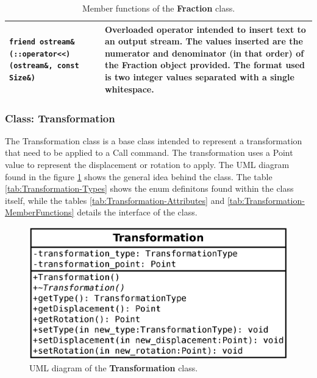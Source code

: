 \documentclass[11pt,twoside,openany,x11names,svgnames]{memoir}
\begin{document}
\begin{table}[h]
\begin{tabular}{| >{\bfseries}p{8cm} | p{7.5cm} |}
	\hline
	
	\texttt{friend ostream\& (::operator<<) (ostream\&, const Size\&)} & Overloaded operator intended to insert text to an output stream. The values inserted are the numerator and denominator (in that order) of the Fraction object provided. The format used is two integer values separated with a single whitespace. \\
	
	\hline
\end{tabular}
\caption{Member functions of the \textbf{Fraction} class.}
\label{tab:Fraction-MemberFunctions}
\end{table}

\clearpage

\subsubsection{Class: Transformation}\label{Class-Transformation}

The Transformation class is a base class intended to represent a transformation that need to be applied to a Call command. The transformation uses a Point value to represent the displacement or rotation to apply. The UML diagram found in the figure \ref{fig:class-transformation} shows the general idea behind the class. The table \ref{tab:Transformation-Types} shows the enum definitons found within the class itself, while the tables \ref{tab:Transformation-Attributes} and \ref{tab:Transformation-MemberFunctions} details the interface of the class.

\begin{figure}
	\centering
	\includegraphics[scale=0.2, clip=true, trim= 0pt 0pt 0pt 0pt]{images/chapter03-image15}
	\caption{UML diagram of the \textbf{Transformation} class.}
	\label{fig:class-transformation}
\end{figure}
\end{document}
